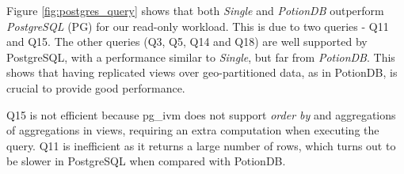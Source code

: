 \documentclass[sigplan,twocolumn,review,anonymous]{acmart}
\begin{document}

Figure \ref{fig:postgres_query} shows that
both \textit{Single} and \textit{PotionDB} outperform \textit{PostgreSQL} (PG) for our read-only workload.
This is due to two queries - Q11 and Q15.
The other queries (Q3, Q5, Q14 and Q18) are well supported by PostgreSQL, with a performance similar to \textit{Single}, 
but far from \textit{PotionDB}. 
This shows that having replicated views over geo-partitioned data, as in PotionDB, is crucial to provide good performance.

Q15 is not efficient because pg\_ivm does not support \emph{order by} and aggregations of aggregations in views, requiring 
an extra computation when executing the query. Q11 is inefficient as it returns a large number of rows, which
turns out to be slower in PostgreSQL when compared with PotionDB.

%
\end{document}
